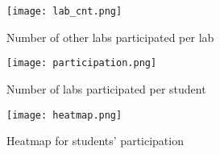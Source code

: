 \documentclass[12pt]{article} %
\begin{document}
\setlength{\pdfpageheight}{\paperheight}
\setlength{\pdfpagewidth}{\paperwidth}
\setlength{\parindent}{0pt} %
\setlength{\parskip}{2ex} %

\begin{figure}
  \centering
  \texttt{[image: lab\_cnt.png]}
  \caption{Number of other labs participated per lab}
\end{figure}

\begin{figure}
  \centering
  \texttt{[image: participation.png]}
  \caption{Number of labs participated per student}
\end{figure}

\begin{figure}
  \centering
  \texttt{[image: heatmap.png]}
  \caption{Heatmap for students' participation}
\end{figure}
\end{document}

